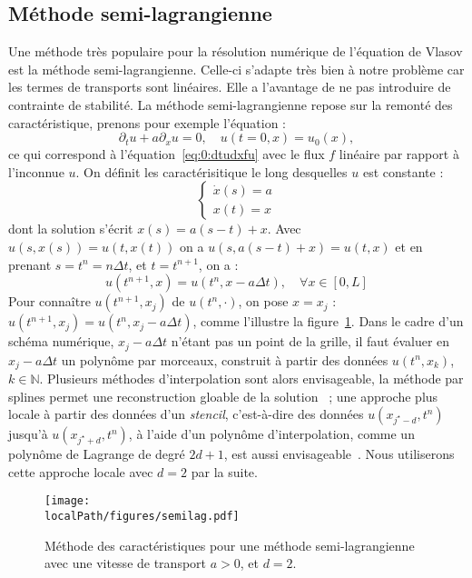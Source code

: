 \subsection{Méthode semi-lagrangienne}

Une méthode très populaire pour la résolution numérique de l'équation de Vlasov est la méthode semi-lagrangienne. Celle-ci s'adapte très bien à notre problème car les termes de transports sont linéaires. Elle a l'avantage de ne pas introduire de contrainte de stabilité. La méthode semi-lagrangienne repose sur la remonté des caractéristique, prenons pour exemple l'équation :
$$
  \partial_t u + a\partial_xu = 0,\quad u(t=0,x)=u_0(x),
$$
ce qui correspond à l'équation~\ref{eq:0:dtudxfu} avec le flux $f$ linéaire par rapport à l'inconnue $u$. On définit les caractérisitique le long desquelles $u$ est constante :
$$
  \begin{cases}
    \dot{x}(s) = a \\
    x(t) = x
  \end{cases}
$$
dont la solution s'écrit $x(s) = a(s-t)+x$. Avec $u(s,x(s))=u(t,x(t))$ on a $u(s,a(s-t)+x) = u(t,x)$ et en prenant $s=t^n=n\Delta t$, et $t=t^{n+1}$, on a :
$$
  u(t^{n+1},x) = u(t^n,x-a\Delta t),\quad \forall x\in[0,L]
$$
Pour connaître $u(t^{n+1},x_j)$ de $u(t^n,\cdot)$, on pose $x=x_j$ : $u(t^{n+1},x_j) = u(t^n,x_j-a\Delta t)$, comme l'illustre la figure~\ref{fig:intro:semilag}. Dans le cadre d'un schéma numérique, $x_j-a\Delta t$ n'étant pas un point de la grille, il faut évaluer en $x_j-a\Delta t$ un polynôme par morceaux, construit à partir des données $u(t^n,x_k)$, $k\in\mathbb{N}$. Plusieurs méthodes d'interpolation sont alors envisageable, la méthode par splines permet une reconstruction gloable de la solution~\cite{Cheng:1976,Sonnendrucker:2015} ; une approche plus locale à partir des données d'un \emph{stencil}, c'est-à-dire des données $u(x_{j^\star-d},t^n)$ jusqu'à $u(x_{j^\star+d},t^n)$, à l'aide d'un polynôme d'interpolation, comme un polynôme de Lagrange de degré $2d+1$, est aussi envisageable~\cite{Charles:2013}. Nous utiliserons cette approche locale avec $d=2$ par la suite.

\begin{figure}[h]
  \centering
  \texttt{[image: \\localPath/figures/semilag.pdf]}
  \caption{Méthode des caractéristiques pour une méthode semi-lagrangienne avec une vitesse de transport $a>0$, et $d=2$.}
  \label{fig:intro:semilag}
\end{figure}


